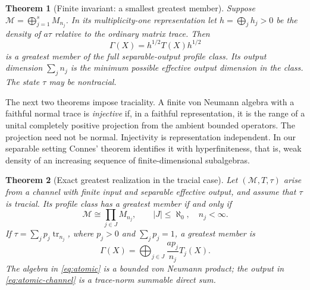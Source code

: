 \documentclass[11pt,reqno]{amsart}
\newtheorem{theorem}{Theorem}[section]
\theoremstyle{definition}
\theoremstyle{remark}
\numberwithin{equation}{section}
\newcommand{\M}{\mathcal M}
\newcommand{\tr}{\operatorname{tr}}
\begin{document}
\begin{theorem}[Finite invariant: a smallest greatest member]\label{thm:finite}
Suppose $\M=\bigoplus_{j=1}^sM_{n_j}$. In its multiplicity-one representation let $h=\bigoplus_jh_j>0$ be the density of $a\tau$ relative to the ordinary matrix trace. Then
\begin{equation}\label{eq:finite-canonical}
 \Gamma(X)=h^{1/2}T(X)h^{1/2}
\end{equation}
is a greatest member of the full separable-output profile class. Its output dimension $\sum_jn_j$ is the minimum possible effective output dimension in the class. The state $\tau$ may be nontracial.
\end{theorem}

The next two theorems impose traciality. A finite von Neumann algebra with a faithful normal trace is \emph{injective} if, in a faithful representation, it is the range of a unital completely positive projection from the ambient bounded operators. The projection need not be normal. Injectivity is representation independent. In our separable setting Connes' theorem identifies it with hyperfiniteness, that is, weak density of an increasing sequence of finite-dimensional subalgebras.

\begin{theorem}[Exact greatest realization in the tracial case]\label{thm:exact}
Let $(\M,T,\tau)$ arise from a channel with finite input and separable effective output, and assume that $\tau$ is tracial. Its profile class has a greatest member if and only if
\begin{equation}\label{eq:atomic}
 \M\cong\prod_{j\in J}M_{n_j},\qquad |J|\le\aleph_0,\quad n_j<\infty.
\end{equation}
If $\tau=\sum_jp_j\tr_{n_j}$, where $p_j>0$ and $\sum_jp_j=1$, a greatest member is
\begin{equation}\label{eq:atomic-channel}
 \Gamma(X)=\bigoplus_{j\in J}\frac{ap_j}{n_j}T_j(X).
\end{equation}
The algebra in \eqref{eq:atomic} is a bounded von Neumann product; the output in \eqref{eq:atomic-channel} is a trace-norm summable direct sum.
\end{theorem}
\end{document}

